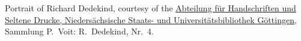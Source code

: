 Portrait of Richard Dedekind, courtesy of the
\href{http://www.sub.uni-goettingen.de/en/contact/departments-a-z/departmental-and-unit-details/abteilunggruppe/handschriften-und-seltene-drucke/}{Abteilung
f\"ur Handschriften und Seltene Drucke, Nieders\"achsische Staats- und
Universit\"atsbibliothek G\"ottingen}, Sammlung P.~Voit: R.~Dedekind,
Nr.~4.
